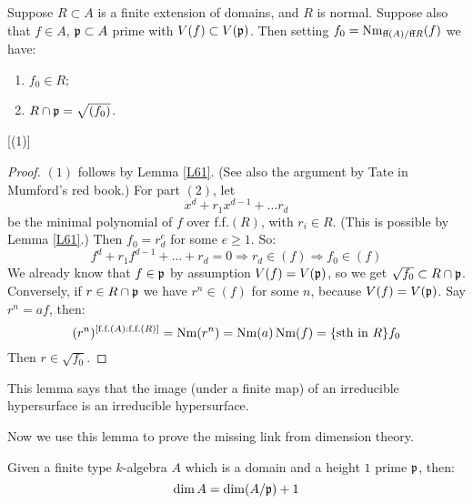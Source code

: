 \documentclass{../mathnotes}
\begin{document}
\begin{lem}
\label{L62}
Suppose $R\subset A$ is a finite extension of domains, and $R$ is normal. Suppose also that $f\in A$, $\mathfrak p \subset A$ prime with $V(f) \subset V(\mathfrak p)$. Then setting $f_0 = \operatorname{Nm}_{\text{ff}(A)/\text{ff}R} (f)$ we have:
\begin{enumerate}
\item $f_0 \in R$;
\item $R \cap \mathfrak p = \sqrt{(f_0)}$.
\end{enumerate} [(1)]
\end{lem}
\begin{proof}
$(1)$ follows by Lemma \ref{L61}. (See also the argument by Tate in Mumford's red book.) For part $(2)$, let
\[    x^d + r_1 x^{d-1} + \dots r_d    \]
be the minimal polynomial of $f$ over f.f.$(R)$, with $r_i \in R$. (This is possible by Lemma \ref{L61}.) Then $f_0 = r_d^e$ for some $e\geq 1$. So:
\[     f^d + r_1 f^{d-1} + \dots + r_d = 0   \Rightarrow r_d \in (f) \Rightarrow f_0 \in (f)   \]
We already know that $f \in \mathfrak p$ by assumption $V(f) = V(\mathfrak p)$, so we get $\sqrt{f_0} \subset R \cap \mathfrak p$. Conversely, if $r \in R \cap \mathfrak p$ we have $r^n\in (f)$ for some $n$, because $V(f) = V(\mathfrak p)$. Say $r^n = af$, then:
\[         (r^n)^{[\text{f.f.}(A) : \text{f.f.}(R)]} = \operatorname{Nm} (r^n) = \operatorname{Nm}(a) \operatorname{Nm}(f) = \{\text{sth in }R\} f_0       \]
Then $r \in \sqrt{f_0}$.
\end{proof}
\begin{rem}
This lemma says that the image (under a finite map) of an irreducible hypersurface is an irreducible hypersurface.
\end{rem}
Now we use this lemma to prove the missing link from dimension theory.
\begin{thm}
\label{L63}
Given a finite type $k$-algebra $A$ which is a domain and a height $1$ prime $\mathfrak p$, then:
\[       \dim A = \dim(A/\mathfrak p) + 1   \]
\end{thm}
\end{document}
